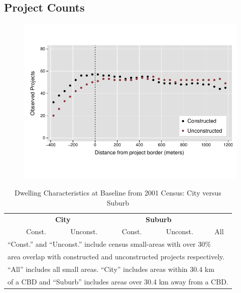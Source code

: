 \documentclass[12pt]{article}
\begin{document}
\pagebreak
\subsection{Project Counts}
\label{appendix:projectcounts}
\vspace{-5mm}
\begin{figure}[h!]
\centering
\includegraphics[scale=1.2,trim={.2cm 1.2cm .2cm 1.2cm},clip]{figures/projectcounts.pdf}
\end{figure}



\begin{table}[h!]
	\centering
	\caption{Dwelling Characteristics at Baseline from 2001 Census: City versus Suburb}\label{table:projectdescriptivescensushet}
\vspace{-2mm}
\begin{tabular}{l*{1}{ccccc}}
\toprule
& \multicolumn{2}{c}{\textbf{City}} & \multicolumn{2}{c}{\textbf{Suburb}} &   \\
& Const. & Unconst. & Const. & Unconst. &  All  \\
\midrule
 
\bottomrule
\multicolumn{6}{l}{\scriptsize ``Const.'' and ``Unconst.'' include census small-areas with over 30\% }  \\ [-.5em]
\multicolumn{6}{l}{\scriptsize  area overlap with constructed and unconstructed projects respectively. } \\ [-.5em]
\multicolumn{6}{l}{\scriptsize ``All''  includes all small areas.  ``City'' includes areas within 30.4 km } \\ [-.5em]
\multicolumn{6}{l}{\scriptsize of a CBD and ``Suburb'' includes areas over 30.4 km away from a CBD. } 
\end{tabular}
\end{table}
\end{document}
